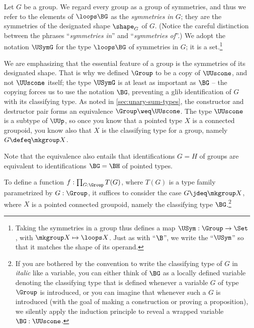 \begin{definition}\label{def:group-symmetries}
  Let $G$ be a group.
  We regard every group as a group of symmetries,
  and thus we refer to the elements of $\loops \BG$ as the
  \emph{symmetries in $G$};
  they are the symmetries of the designated shape $\shape_G$ of $G$.
  (Notice the careful distinction between the phrases
  ``\emph{symmetries in}'' and ``\emph{symmetries of}''.)
  We adopt the notation $\USymG$ for the type $\loops \BG$ of symmetries in $G$;
  it is a set.\footnote{%
    Taking the symmetries in a group
    thus defines a map
    $\USym : \Group \to \Set$,
    with $\mkgroup X \mapsto \loops X$.
    Just as with ``$\B$'', we write the ``$\USym$'' so that it matches
    the shape of its operand.}
\end{definition}

\begin{remark}\label{rem:aut}
  We are emphasizing that the essential feature of a group
  is the symmetries of its designated shape.
  That is why we defined $\Group$ to be a copy of $\UUscone$,
  and not $\UUscone$ itself;
  the type $\USymG$ is at least as important as $\BG$
  -- the copying forces us to use the notation $\BG$,
  preventing a glib identification of $G$ with its classifying type.
  As noted in \cref{sec:unary-sum-types},
  the constructor and destructor pair forms an equivalence $\Group \weq \UUscone$.
  The type $\UUscone$ is a subtype of $\UUp$, so
  once you know that a pointed type $X$ is a connected groupoid,
  you know also that $X$ is the classifying type for a group,
  namely $G\defeq\mkgroup X$.

  Note that the equivalence also entails
  that identifications $G=H$ of groups are equivalent
  to identifications $\BG = \BH$ of pointed types.
\end{remark}

\begin{remark}\label{rem:BG-convention}
  To define a function $f : \prod_{G:\Group}T(G)$,
  where $T(G)$ is a type family parametrized by $G:\Group$,
  it suffices to consider the case $G\jdeq\mkgroup X$,
  where $X$ is a pointed connected groupoid,
  namely the classifying type $\BG$.\footnote{%
    If you are bothered by the convention
    to write the classifying type of $G$ in \emph{italic} like a variable,
    you can either think of $\BG$ as a locally defined
    variable denoting the classifying type that is
    defined whenever a variable $G$ of type $\Group$ is introduced,
    or you can imagine that whenever such a $G$ is introduced
    (with the goal of making a construction or proving a proposition),
    we silently apply the induction principle to
    reveal a wrapped variable $\BG:\UUscone$.}
\end{remark}

